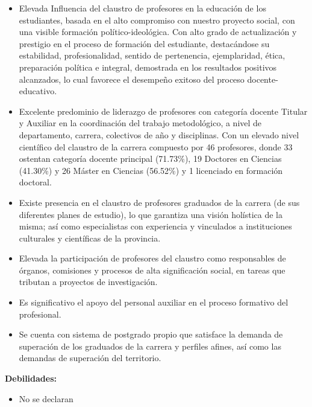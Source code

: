 \begin{itemize}
	\item Elevada Influencia del claustro de profesores en la educación de los estudiantes, basada en el alto compromiso con nuestro proyecto social, con una visible formación político-ideológica. Con alto grado de actualización y prestigio en el proceso de formación del estudiante, destacándose su estabilidad, profesionalidad, sentido de pertenencia, ejemplaridad, ética, preparación política e integral, demostrada en los resultados positivos alcanzados, lo cual favorece el desempeño exitoso del proceso docente-educativo.
	\item Excelente predominio de liderazgo de profesores con categoría docente Titular y Auxiliar en la coordinación del trabajo metodológico, a nivel de departamento, carrera, colectivos de año y disciplinas. Con un elevado nivel científico del claustro de la carrera compuesto por 46 profesores, donde 33 ostentan categoría docente principal (71.73\%), 19 Doctores en Ciencias (41.30\%) y 26 Máster en Ciencias (56.52\%) y 1 licenciado en formación doctoral.
	\item Existe presencia en el claustro de profesores graduados de la carrera (de sus diferentes planes de estudio), lo que garantiza una visión holística de la misma; así como especialistas con experiencia y vinculados a instituciones culturales y científicas de la provincia.
	\item Elevada la participación de profesores del claustro como responsables de órganos, comisiones y procesos de alta significación social, en tareas que tributan a proyectos de investigación.
	\item Es significativo el apoyo del personal auxiliar en el proceso formativo del profesional.
	\item Se cuenta con sistema de postgrado propio que satisface la demanda de superación de los graduados de la carrera y perfiles afines, así como las demandas de superación del territorio.
\end{itemize}

\textbf{Debilidades:}

\begin{itemize}
	\item No se declaran
\end{itemize}